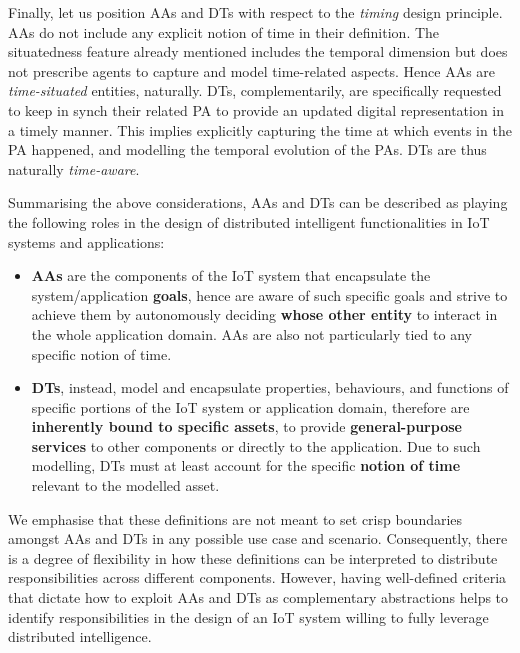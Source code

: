 Finally, let us position AAs and DTs with respect to the \emph{timing} design principle. 
AAs do not include any explicit notion of time in their definition. 
The situatedness feature already mentioned includes the temporal dimension but does not prescribe agents to capture and model time-related aspects. 
Hence AAs are \emph{time-situated} entities, naturally. 
DTs, complementarily, are specifically requested to keep in synch %
their related PA to provide an updated digital representation in a timely manner. 
This implies explicitly capturing the time at which events in the PA happened, and modelling the temporal evolution of the PAs. %
DTs are thus naturally \emph{time-aware}. 

Summarising the above considerations, AAs and DTs can be described as playing the following roles in the design of distributed intelligent functionalities in IoT systems and applications:
\begin{itemize}
    \item \textbf{AAs} are the components of the IoT system that encapsulate the system/application \textbf{goals}, hence are aware of such specific goals and strive to achieve them by autonomously deciding \textbf{whose other entity} to interact in the whole application domain. 
    AAs are also not particularly tied to any specific notion of time. 
    \item \textbf{DTs}, instead, model and encapsulate properties, behaviours, and functions of specific portions of the IoT system or application domain, therefore are \textbf{inherently bound to specific assets}, to provide \textbf{general-purpose services} to other components or directly to the application. 
    Due to such modelling, DTs must at least account for the specific \textbf{notion of time} relevant to the modelled asset. 
\end{itemize}
%
We emphasise that these definitions are not meant to set crisp boundaries amongst AAs and DTs in any possible use case and scenario. 
%
Consequently, there is a degree of flexibility in how these definitions can be interpreted to distribute responsibilities across different components.
%
However, having well-defined criteria that dictate how to exploit AAs and DTs as complementary abstractions helps to identify responsibilities in the design of an IoT system willing to fully leverage distributed intelligence.
%

